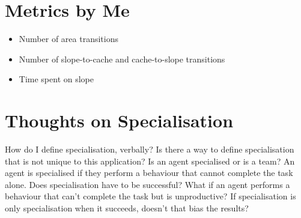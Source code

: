 \documentclass[12pt]{article}
\begin{document}
\section{Metrics by Me}

\begin{itemize}
\item Number of area transitions
\item Number of slope-to-cache and cache-to-slope transitions
\item Time spent on slope
\end{itemize}

\section{Thoughts on Specialisation}

How do I define specialisation, verbally?
Is there a way to define specialisation that is not unique to this application?
Is an agent specialised or is a team?
An agent is specialised if they perform a behaviour that cannot complete the task alone.
Does specialisation have to be successful?
What if an agent performs a behaviour that can't complete the task but is unproductive?
If specialisation is only specialisation when it succeeds, doesn't that bias the results?

 

\end{document}

